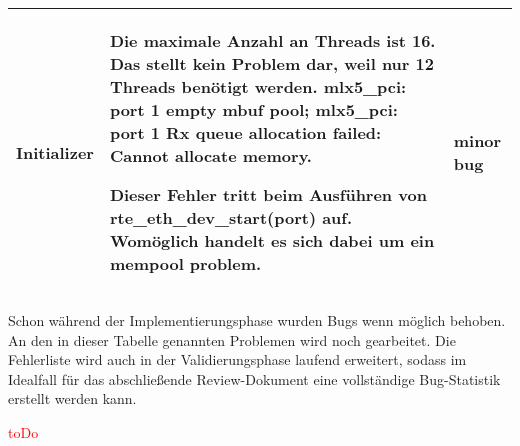 \documentclass[../review_3.tex]{subfiles}
\begin{document}
\begin{longtable} [h] {p{3cm} p{8.7cm} l}

    Initializer                                                                                                                                                                                                                                                                                                                                                                                                                                             &
    Die maximale Anzahl an Threads ist 16. Das stellt kein Problem dar, weil nur 12 Threads benötigt werden. mlx5\_pci: port 1 empty mbuf pool; mlx5\_pci: port 1 Rx queue allocation failed: Cannot allocate memory.

    Dieser Fehler tritt beim Ausführen von rte\_eth\_dev\_start(port) auf. Womöglich handelt es sich dabei um ein mempool problem.
                                                                                                                                                                                                                                                                                                                                                                                                                                                            & minor bug                                  \\

    \bottomrule
\end{longtable}

Schon während der Implementierungsphase wurden Bugs wenn möglich behoben. An den in dieser Tabelle genannten Problemen wird noch gearbeitet. Die Fehlerliste wird auch in der Validierungsphase laufend erweitert, sodass im Idealfall für das abschließende Review-Dokument eine vollständige Bug-Statistik erstellt werden kann.

\textcolor{red}{toDo}
\end{document}
